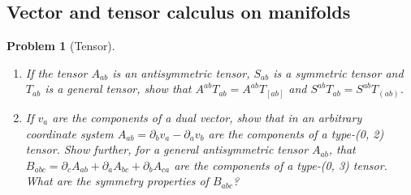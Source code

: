 \documentclass[a4paper]{article}
\theoremstyle{new2}
\theoremstyle{new}
\newtheorem{qns}{Problem}[section]
\begin{document}
\subsection*{Vector and tensor calculus on manifolds}
\begin{qns}[Tensor]\leavevmode
\begin{enumerate}[label=(\alph*)]
\item If the tensor $A_{ab}$ is an antisymmetric tensor, $S_{ab}$ is a symmetric tensor and $T_{ab}$ is a general tensor, show that $A^{ab}T_{ab} = A^{ab}T_{[ab]}$ and $S^{ab}T_{ab}=S^{ab}T_{(ab)}$. 
\item If $v_a$ are the components of a dual vector, show that in an arbitrary coordinate system $A_{ab} = \partial_bv_a−\partial_av_b$ are the components of a type-(0, 2) tensor. Show further, for a general antisymmetric tensor $A_{ab}$, that $B_{abc} = \partial_cA_{ab} + \partial_aA_{bc} + \partial_bA_{ca}$ are the components of a type-(0, 3) tensor. What are the symmetry properties of $B_{abc}$?
\end{enumerate}
\end{qns}
\end{document}
